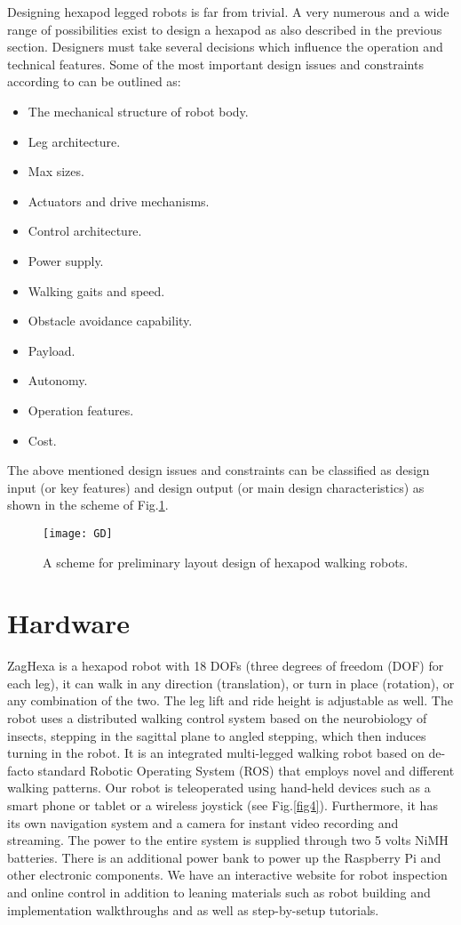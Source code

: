 
Designing hexapod legged robots is far from trivial. A very numerous and a wide range of
possibilities exist to design a hexapod as also described in the previous section. Designers must take several decisions which influence the operation and technical features. Some of the most important design issues and constraints according to \cite{48h} can be outlined as:
\begin{itemize}
	\item The mechanical structure of robot body.
	\item Leg architecture.
	\item Max sizes.
	\item Actuators and drive mechanisms.
	\item Control architecture.
	\item Power supply.
	\item Walking gaits and speed.
	\item Obstacle avoidance capability.
	\item Payload.
	\item Autonomy.
	\item Operation features.
	\item Cost.
\end{itemize}
The above mentioned design issues and constraints can be classified as design input (or key	features) and design output (or main design characteristics) as shown in the scheme of Fig.\ref{GD}.
\begin{figure}[h]		
	\centering
	\texttt{[image: GD]}
    \caption{ A scheme for preliminary layout design of hexapod walking robots.}
	\label{GD}
\end{figure}

\section{Hardware}
ZagHexa is a hexapod robot with 18 DOFs (three degrees of freedom (DOF) for each leg), it can walk in any direction (translation), or turn in place (rotation), or any combination of the two. The leg lift and ride height is adjustable as well. The robot uses a distributed walking control system based on the neurobiology of insects, stepping in the sagittal plane to angled stepping, which then induces turning in the robot.
It is an integrated multi-legged walking robot based on de-facto standard Robotic Operating System (ROS) that employs novel and different walking patterns.
Our robot is teleoperated using hand-held devices such as a smart phone or tablet or a wireless joystick (see Fig.\ref{fig4}). Furthermore, it has its own navigation system and a camera for instant video recording and streaming.
The power to the entire system is supplied through two 5 volts NiMH batteries. There is an additional power bank to power up the Raspberry Pi and other electronic components. 
We have an interactive website for robot inspection and online control in addition to leaning materials such as robot building and implementation walkthroughs and as well as step-by-setup tutorials.

